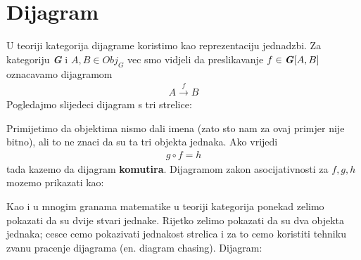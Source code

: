 \documentclass[11pt]{article}
\newcommand{\category}[1]{\textbf{\emph{#1}}}
\theoremstyle{definition}
\begin{document}
  \newpage
  \section{Dijagram}
  U teoriji kategorija dijagrame koristimo kao reprezentaciju jednadzbi.
  Za kategoriju \category{G} i $A, B \in Obj_G$ vec smo vidjeli da
  preslikavanje $f \in \category{G}[A, B]$ oznacavamo dijagramom
  \begin{align*}
    A \xrightarrow{f} B
  \end{align*}
  Pogledajmo slijedeci dijagram s tri strelice:
  \begin{center}
  \end{center}
  Primijetimo da objektima nismo dali imena (zato sto nam za ovaj primjer nije
  bitno), ali to ne znaci da su ta tri objekta jednaka. Ako vrijedi
  \begin{align*}
    g \circ f = h
  \end{align*}
  tada kazemo da dijagram \textbf{komutira}.
  Dijagramom zakon asocijativnosti za $f, g, h$ mozemo prikazati kao:
  \begin{center}
  \end{center}


  Kao i u mnogim granama matematike u teoriji kategorija ponekad zelimo
  pokazati da su dvije stvari jednake. Rijetko zelimo pokazati da su dva
  objekta jednaka; cesce cemo pokazivati jednakost strelica i za to cemo
  koristiti tehniku zvanu pracenje dijagrama (en. diagram chasing).
  Dijagram:
\end{document}
